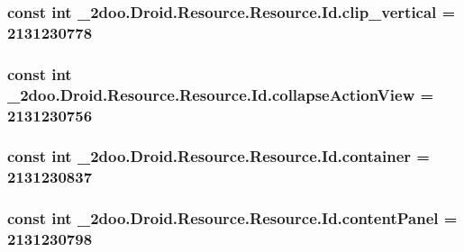 \hypertarget{class__2doo_1_1_droid_1_1_resource_1_1_id_4d5b3f73085d38eeb1092d754ecd1e50}{
\subsubsection[{clip\_\-vertical}]{\setlength{\rightskip}{0pt plus 5cm}const int \_\-2doo.Droid.Resource.Resource.Id.clip\_\-vertical = 2131230778}}
\label{class__2doo_1_1_droid_1_1_resource_1_1_id_4d5b3f73085d38eeb1092d754ecd1e50}


\hypertarget{class__2doo_1_1_droid_1_1_resource_1_1_id_4382174a9d778ab31a2ac24159fa97ec}{
\subsubsection[{collapseActionView}]{\setlength{\rightskip}{0pt plus 5cm}const int \_\-2doo.Droid.Resource.Resource.Id.collapseActionView = 2131230756}}
\label{class__2doo_1_1_droid_1_1_resource_1_1_id_4382174a9d778ab31a2ac24159fa97ec}


\hypertarget{class__2doo_1_1_droid_1_1_resource_1_1_id_eefbfbb670927c41deca4965461549da}{
\subsubsection[{container}]{\setlength{\rightskip}{0pt plus 5cm}const int \_\-2doo.Droid.Resource.Resource.Id.container = 2131230837}}
\label{class__2doo_1_1_droid_1_1_resource_1_1_id_eefbfbb670927c41deca4965461549da}


\hypertarget{class__2doo_1_1_droid_1_1_resource_1_1_id_8f013f2546edf234cfedf3c5884113dc}{
\subsubsection[{contentPanel}]{\setlength{\rightskip}{0pt plus 5cm}const int \_\-2doo.Droid.Resource.Resource.Id.contentPanel = 2131230798}}
\label{class__2doo_1_1_droid_1_1_resource_1_1_id_8f013f2546edf234cfedf3c5884113dc}


